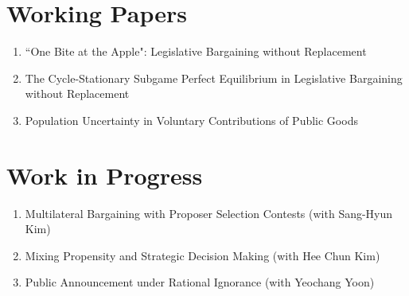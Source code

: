 \documentclass[margin]{res}
\begin{document}
\begin{resume}

\section{Working Papers}
\begin{enumerate}
\item ``One Bite at the Apple": Legislative Bargaining without Replacement
\item The Cycle-Stationary Subgame Perfect Equilibrium in Legislative Bargaining without Replacement
\item Population Uncertainty in Voluntary Contributions of Public Goods
\end{enumerate}

\section{Work in Progress}
\begin{enumerate}
\item Multilateral Bargaining with Proposer Selection Contests (with Sang-Hyun Kim)
\item Mixing Propensity and Strategic Decision Making (with Hee Chun Kim)
\item Public Announcement under Rational Ignorance (with Yeochang Yoon)
\end{enumerate}


\end{resume}
\end{document}
